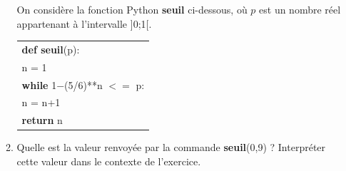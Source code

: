 \begin{enumerate}
\begin{enumerate}
On considère la fonction Python \textbf{seuil} ci-dessous, où $p$ est un nombre réel appartenant à l’intervalle ]0;1[.
\begin{center}
\begin{tabular}[]{|l|}
\hline
\textbf{def seuil}(p):\\
\hspace{2em}n = 1\\
\hspace{2em}\textbf{while} 1$-$(5/6)**n $< =$ p:\\
\hspace{4.5em}n = n+1\\
\hspace{2em}\textbf{return} n\\
\hline
\end{tabular}
\end{center}

		\item Quelle est la valeur renvoyée par la commande \textbf{seuil}(0,9) ? Interpréter cette valeur dans le contexte de l’exercice.
	\end{enumerate}
\end{enumerate}

\bigskip
